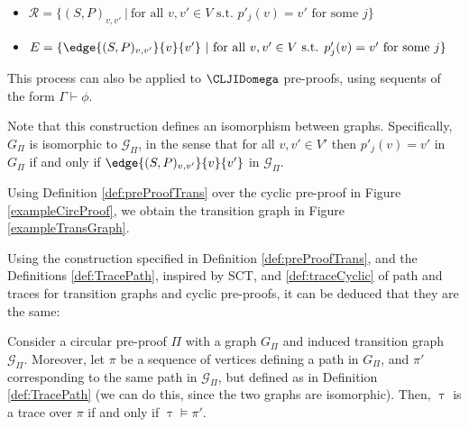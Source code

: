 \begin{definition}
\begin{itemize}
\begin{enumerate}[i)]
            \item If $r(v)$ is a case split rule, then for all $(Q\mathbf{t},j)$ in $\Theta$, $(P\mathbf{u},i) P (Q\mathbf{t},j)$ if and only if $(P\mathbf{u},i) \rightarrow_{r(v)} (Q\mathbf{t},j)$ and $(P\mathbf{u},i)$ is the progressing 
            occurrence in $\Gamma$. Otherwise, if $(P\mathbf{u},i)$ is stationary, then $(P\mathbf{u},i) S (Q\mathbf{t},j)$.

        \end{enumerate}

    \item $\mathcal{R} = \{(S,P)_{v,v'} \ | \ \text{for all $v,v' \in V$ s.t. $p'_j(v) = v'$ for some $j$}  \}$

    \item $E = \{\edge{(S,P)_{v,v'}}{v}{v'} \ | \ \text{for all $v,v' \in V$ s.t. $p'_j(v) = v'$ for some $j$}  \}$
 \end{itemize} 

This process can also be applied to $\CLJIDomega$ pre-proofs, using sequents of the form $\Gamma \vdash \phi$.

\end{definition}

Note that this construction defines an isomorphism between graphs. Specifically, $G_{\Pi}$ is isomorphic to $\mathcal{G}_{\Pi}$, in the sense that for all $v,v' \in V'$ then $p'_j(v) = v'$ in $G_{\Pi}$ if and only if $\edge{(S,P)_{v,v'}}{v}{v'}$ in $\mathcal{G}_{\Pi}$.




\begin{example}
    Using Definition \ref{def:preProofTrans} over the cyclic pre-proof in Figure \ref{exampleCircProof}, we obtain the transition graph in Figure \ref{exampleTransGraph}. 
\end{example}

Using the construction specified in Definition \ref{def:preProofTrans}, and the Definitions \ref{def:TracePath}, inspired by SCT, and \ref{def:traceCyclic} of path and traces for transition graphs and cyclic pre-proofs, it can be deduced that they are the same:


\begin{proposition}
Consider a circular pre-proof $\Pi$ with a graph $G_{\Pi}$ and induced transition graph $\mathcal{G}_{\Pi}$. Moreover, let $\pi$ be a sequence of vertices defining a path in $G_{\Pi}$, and $\pi'$ corresponding to the same path in $\mathcal{G}_{\Pi}$, but defined as in Definition \ref{def:TracePath} (we can do this, since the two graphs are isomorphic). Then, $\uptau$ is a trace over $\pi$ if and only if $\uptau \models \pi'$.
\end{proposition}


